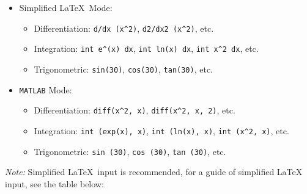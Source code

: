 \documentclass{article}
\begin{document}
\begin{itemize}
\item Simplified \LaTeX \, Mode:

  \begin{itemize}
  \item Differentiation: \texttt{d/dx\ (x\^{}2)},
    \texttt{d2/dx2\ (x\^{}2)}, etc.
  \item Integration: \texttt{int\ e\^{}(x)\ dx},
    \texttt{int\ ln(x)\ dx}, \texttt{int\ x\^{}2\ dx}, etc.
  \item Trigonometric: \texttt{sin(30)}, \texttt{cos(30)},
    \texttt{tan(30)}, etc.
  \end{itemize}
\item
  \texttt{MATLAB} Mode:

  \begin{itemize}
  \item Differentiation: \texttt{diff(x\^{}2,\ x)},
    \texttt{diff(x\^{}2,\ x,\ 2)}, etc.
  \item Integration: \texttt{int (exp(x),\ x)},
    \texttt{int (ln(x),\ x)}, \texttt{int (x\^{}2,\ x)}, etc.
  \item Trigonometric: \texttt{sin (30)}, \texttt{cos (30)},
    \texttt{tan (30)}, etc.
  \end{itemize}
\end{itemize}

\noindent

\noindent \emph{Note:} Simplified \LaTeX \, input is recommended, for a guide of
simplified \LaTeX \, input, see the table below:

\renewcommand{\arraystretch}{2.2}
\end{document}
